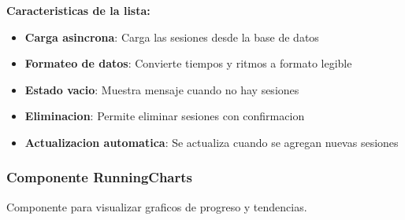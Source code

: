 \documentclass[12pt,a4paper]{article}
\begin{document}
\textbf{Caracteristicas de la lista:}
\begin{itemize}
    \item \textbf{Carga asincrona}: Carga las sesiones desde la base de datos
    \item \textbf{Formateo de datos}: Convierte tiempos y ritmos a formato legible
    \item \textbf{Estado vacio}: Muestra mensaje cuando no hay sesiones
    \item \textbf{Eliminacion}: Permite eliminar sesiones con confirmacion
    \item \textbf{Actualizacion automatica}: Se actualiza cuando se agregan nuevas sesiones
\end{itemize}

\subsubsection{Componente RunningCharts}

Componente para visualizar graficos de progreso y tendencias.
\end{document}
